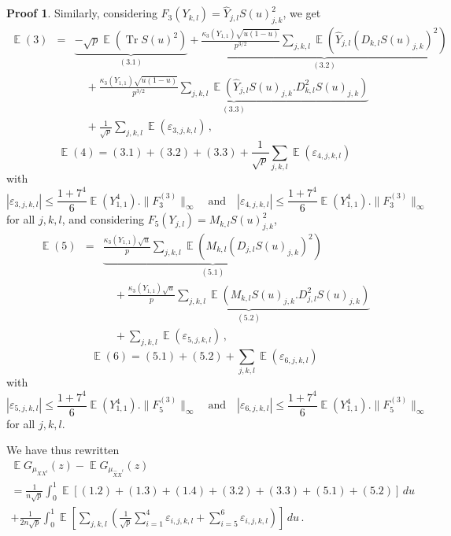 \documentclass[11pt,a4paper]{article}
\DeclareMathOperator{\E}{\mathbb{E}}
\DeclareMathOperator{\1}{\mathbf{1}}
\DeclareMathOperator{\Tr}{\mathrm{Tr}}
\newcommand{\Xhat}{\widehat{X}}
\newcommand{\Yhat}{\widehat{Y}}
\theoremstyle{definition}
\newtheorem*{Proof}{Proof}
\begin{document}
\begin{Proof}
Similarly, considering $F_3(Y_{k,l}) = \Yhat_{j,l} S(u)^2_{j,k}$, we get
\begin{eqnarray} \label{freeness_general_eq4}
\E(3) & = & \underbrace{  -\sqrt{p} \E (\Tr S(u)^2)  }_{(3.1)}  +  \underbrace{  \frac{\kappa_3(Y_{1,1})\sqrt{u(1-u)}}{p^{3/2}} \sum_{j,k,l} \E (\Yhat_{j,l}(D_{k,l}S(u)_{j,k})^2)  }_{(3.2)} \nonumber \\
& & \quad + \underbrace{  \frac{\kappa_3(Y_{1,1})\sqrt{u(1-u)}}{p^{3/2}} \sum_{j,k,l} \E (\Yhat_{j,l}S(u)_{j,k}.D^2_{k,l}S(u)_{j,k})  }_{(3.3)} \nonumber \\
& & \quad +  \frac{1}{\sqrt{p}} \sum_{j,k,l} \E(\varepsilon_{3,j,k,l}) \, ,
\end{eqnarray}
\begin{equation} \label{freeness_general_eq5}
\E(4) = (3.1) + (3.2) + (3.3) + \frac{1}{\sqrt{p}} \sum_{j,k,l} \E(\varepsilon_{4,j,k,l})
\end{equation}
with
\begin{displaymath}
|\varepsilon_{3,j,k,l}| \le \frac{1+7^4}{6} \E(Y_{1,1}^4) . \|F_3^{(3)}\|_{\infty} \quad \textrm{and} \quad |\varepsilon_{4,j,k,l}| \le \frac{1+7^4}{6} \E(Y_{1,1}^4) . \|F_3^{(3)}\|_{\infty}
\end{displaymath}
for all $j,k,l$, and considering $F_5(Y_{j,l}) = M_{k,l} S(u)^2_{j,k}$,
\begin{eqnarray} \label{freeness_general_eq6}
\E(5) & = & \underbrace{  \frac{\kappa_3(Y_{1,1})\sqrt{u}}{p} \sum_{j,k,l} \E (M_{k,l}(D_{j,l}S(u)_{j,k})^2)  }_{(5.1)} \nonumber \\
& & \quad  +  \underbrace{  \frac{\kappa_3(Y_{1,1})\sqrt{u}}{p} \sum_{j,k,l} \E (M_{k,l}S(u)_{j,k}.D^2_{j,l}S(u)_{j,k})  }_{(5.2)} \nonumber \\
& & \quad +  \sum_{j,k,l} \E(\varepsilon_{5,j,k,l}) \, ,
\end{eqnarray}
\begin{equation} \label{freeness_general_eq7}
\E(6) = (5.1) + (5.2) + \sum_{j,k,l} \E(\varepsilon_{6,j,k,l})
\end{equation}
with
\begin{displaymath}
|\varepsilon_{5,j,k,l}| \le \frac{1+7^4}{6} \E(Y_{1,1}^4) . \|F_5^{(3)}\|_{\infty} \quad \textrm{and} \quad |\varepsilon_{6,j,k,l}| \le \frac{1+7^4}{6} \E(Y_{1,1}^4) . \|F_5^{(3)}\|_{\infty}
\end{displaymath}
for all $j,k,l$.

We have thus rewritten
\begin{multline*}
\E G_{\mu_{XX^t}}(z) - \E G_{\mu_{\Xhat\Xhat^t}}(z) \\
= \frac{1}{n\sqrt{p}} \int_0^1 \E[(1.2)+(1.3)+(1.4)+(3.2)+(3.3)+(5.1)+(5.2)] \, du \\
+ \frac{1}{2n\sqrt{p}} \int_0^1 \E \left[ \sum_{j,k,l} \left( \frac{1}{\sqrt{p}} \sum_{i=1}^4 \varepsilon_{i,j,k,l} + \sum_{i=5}^6 \varepsilon_{i,j,k,l} \right) \right] \, du \, .
\end{multline*}\\


\end{Proof}
\end{document}
